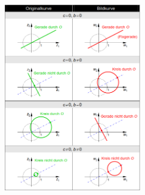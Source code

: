 	\hspace{2cm}
	\begin{minipage}{6cm}
		\includegraphics[width=6cm]{./bilder/Kurvenspiegelung.png}
    \end{minipage}


%	
%
%



